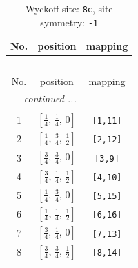 \documentclass[fleqn,8pt]{jsarticle}
\begin{document}
\renewcommand{\arraystretch}{1.2}
\begin{longtable}{ccc}
\caption{Wyckoff site: {\tt 8c}, site symmetry: {\tt -1}}
 \\
 \hline \hline
No. & position & mapping \\ \hline \endfirsthead

\multicolumn{2}{l}{\tablename\ \thetable{}} \\
 \hline \hline
No. & position & mapping \\ \hline \endhead

 \hline \hline
\multicolumn{2}{r}{\footnotesize\it continued ...} \\ \endfoot

 \hline \hline
\multicolumn{2}{r}{} \\ \endlastfoot

1 & $\left[ \frac{1}{4},\, \frac{1}{4},\, 0 \right]$ & {\tt [1,11]} \\ \hline
2 & $\left[ \frac{1}{4},\, \frac{3}{4},\, \frac{1}{2} \right]$ & {\tt [2,12]} \\ \hline
3 & $\left[ \frac{3}{4},\, \frac{3}{4},\, 0 \right]$ & {\tt [3,9]} \\ \hline
4 & $\left[ \frac{3}{4},\, \frac{1}{4},\, \frac{1}{2} \right]$ & {\tt [4,10]} \\ \hline
5 & $\left[ \frac{1}{4},\, \frac{3}{4},\, 0 \right]$ & {\tt [5,15]} \\ \hline
6 & $\left[ \frac{1}{4},\, \frac{1}{4},\, \frac{1}{2} \right]$ & {\tt [6,16]} \\ \hline
7 & $\left[ \frac{3}{4},\, \frac{1}{4},\, 0 \right]$ & {\tt [7,13]} \\ \hline
8 & $\left[ \frac{3}{4},\, \frac{3}{4},\, \frac{1}{2} \right]$ & {\tt [8,14]} \\
\end{longtable}
\renewcommand{\arraystretch}{1.2}
\end{document}
